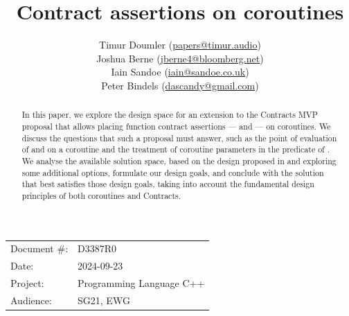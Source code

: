 

 \usepackage[bottom]{footmisc} 

 \usepackage{longtable}


\usepackage{tikz,lipsum,lmodern}
\usepackage[most]{tcolorbox}



\usepackage{titlesec}
\usepackage{tocloft}


\newcommand{\changelocaltocdepth}[1]{%
  \addtocontents{toc}{\protect\setcounter{tocdepth}{#1}}%
  \setcounter{tocdepth}{#1}%
}

\setcounter{tocdepth}{3}



\title{Contract assertions on coroutines}
\author{
Timur Doumler \small(\href{mailto:papers@timur.audio}{papers@timur.audio}) \\
Joshua Berne \small(\href{mailto:jberne4@bloomberg.net}{jberne4@bloomberg.net}) \\
Iain Sandoe \small(\href{mailto:iain@sandoe.co.uk}{iain@sandoe.co.uk}) \\
Peter Bindels \small(\href{mailto:dascandy@gmail.com}{dascandy@gmail.com}) 
}
\date{}
\maketitle

\begin{tabular}{ll}
Document \#: & D3387R0 \\
Date: &2024-09-23 \\
Project: & Programming Language C++ \\
Audience: & SG21, EWG
\end{tabular}

\begin{abstract}
In this paper, we explore the design space for an extension to the Contracts MVP proposal \cite{P2900R8} that allows placing function contract assertions ---  and 
 --- on coroutines. We discuss the questions that such a proposal must answer, such as the point of evaluation of  and  on a coroutine and the treatment of coroutine parameters in the predicate of . We analyse the available solution space, based on the design proposed in \cite{P2957R1} and exploring some additional options, formulate our design goals, and conclude with the solution that best satisfies those design goals, taking into account the fundamental design principles of both coroutines and Contracts.
\end{abstract}

